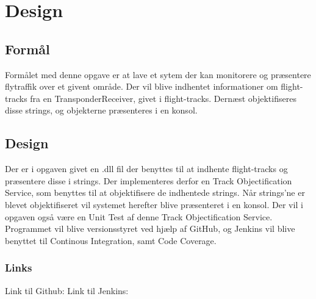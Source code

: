 \chapter{Design}
\section{Formål}
Formålet med denne opgave er at lave et sytem der kan monitorere og præsentere flytraffik over et givent område. Der vil blive indhentet informationer om flight-tracks fra en TransponderReceiver, givet i flight-tracks. Dernæst objektifiseres disse strings, og objekterne præsenteres i en konsol. 
\section{Design}
Der er i opgaven givet en .dll fil der benyttes til at indhente flight-tracks og præsentere disse i strings. Der implementeres derfor en Track Objectification Service, som benyttes til at objektifisere de indhentede strings. \tabularnewline
Når strings'ne er blevet objektifiseret vil systemet herefter blive præsenteret i en konsol. \newline \newline
Der vil i opgaven også være en Unit Test af denne Track Objectification Service. \newline
Programmet vil blive versionsstyret ved hjælp af GitHub, og Jenkins vil blive benyttet til Continous Integration, samt Code Coverage.
\subsection{Links}
Link til Github: \newline \newline
Link til Jenkins: \\